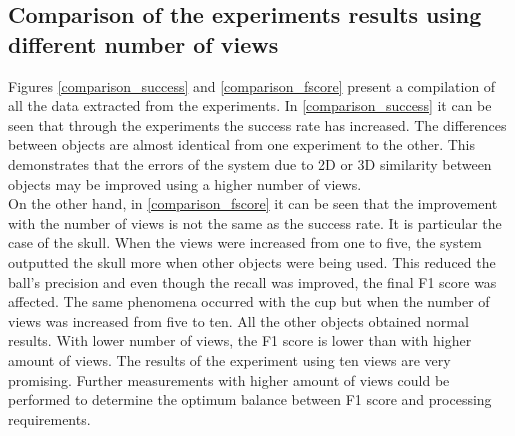 	\subsection{Comparison of the experiments results using different number of views}
	Figures \ref{comparison_success} and \ref{comparison_fscore} present a compilation of all the data extracted from the experiments. 
	In \ref{comparison_success} it can be seen that through the experiments the success rate has increased. 
	The differences between objects are almost identical from one experiment to the other. 
	This demonstrates that the errors of the system due to 2D or 3D similarity between objects may be improved using a higher number of views. 
	\\
	On the other hand, in \ref{comparison_fscore} it can be seen that the improvement with the number of views is not the same as the success rate. 
	It is particular the case of the skull. 
	When the views were increased from one to five, the system outputted the skull more when other objects were being used. 
	This reduced the ball's precision and even though the recall was improved, the final F1 score was affected.  
	The same phenomena occurred with the cup but when the number of views was increased from five to ten. 
	All the other objects obtained normal results. 
	With lower number of views, the F1 score is lower than with higher amount of views. 
	The results of the experiment using ten views are very promising. 
	Further measurements with higher amount of views could be performed to determine the optimum balance between F1 score and processing requirements. 